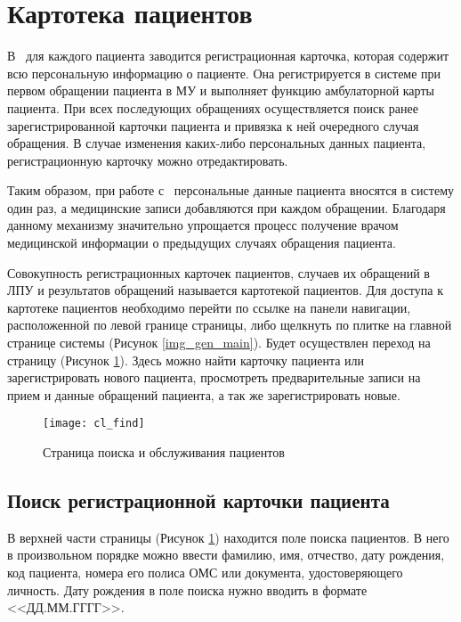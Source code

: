 \newpage
\section{Картотека пациентов}

В \tmis ~для каждого пациента заводится регистрационная карточка, которая содержит всю персональную информацию о пациенте. Она регистрируется в системе при первом обращении пациента в МУ и выполняет функцию амбулаторной карты пациента. При всех последующих обращениях осуществляется поиск ранее зарегистрированной карточки пациента и привязка к ней очередного случая обращения. В случае изменения каких-либо персональных данных пациента, регистрационную карточку можно отредактировать. 

Таким образом, при работе с \tmis~персональные данные пациента вносятся в систему один раз, а медицинские записи добавляются при каждом обращении. Благодаря данному механизму значительно упрощается процесс получение врачом медицинской информации о предыдущих случаях обращения пациента.

Совокупность регистрационных карточек пациентов, случаев их обращений в ЛПУ и результатов обращений называется картотекой пациентов. Для доступа к картотеке пациентов необходимо перейти по ссылке  на панели навигации, расположенной по левой границе страницы, либо щелкнуть по плитке  на главной странице системы (Рисунок \ref{img_gen_main}). Будет осуществлен переход на страницу  (Рисунок \ref{img_cl_find}). Здесь можно найти карточку пациента или зарегистрировать нового пациента, просмотреть предварительные записи на прием и данные обращений пациента, а так же зарегистрировать новые.

\begin{figure}[ht]\centering
 \texttt{[image: cl\_find]}
 \caption{Страница поиска и обслуживания пациентов}
 \label{img_cl_find}
\end{figure} 

\subsection{Поиск регистрационной карточки пациента} \label{cl_find}

В верхней части страницы   (Рисунок \ref{img_cl_find}) находится поле поиска пациентов. В него в произвольном порядке можно ввести фамилию, имя, отчество, дату рождения, код пациента, номера его полиса ОМС или документа, удостоверяющего личность. Дату рождения в поле поиска нужно вводить в формате <<ДД.ММ.ГГГГ>>. %

